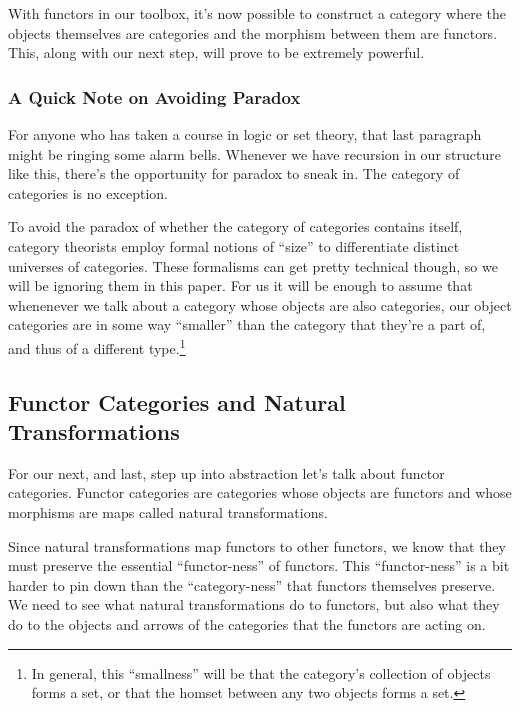 \documentclass[12pt]{article}
\begin{document}
With functors in our toolbox, it's now possible to construct a category where the objects themselves are categories and the morphism between them are functors.
This, along with our next step, will prove to be extremely powerful.

\subsubsection*{A Quick Note on Avoiding Paradox}
For anyone who has taken a course in logic or set theory, that last paragraph might be ringing some alarm bells.
Whenever we have recursion in our structure like this, there's the opportunity for paradox to sneak in.
The category of categories is no exception.

To avoid the paradox of whether the category of categories contains itself, category theorists employ formal notions of ``size'' to differentiate distinct universes of categories.
These formalisms can get pretty technical though, so we will be ignoring them in this paper.
For us it will be enough to assume that whenenever we talk about a category whose objects are also categories, our object categories are in some way ``smaller'' than the category that they're a part of, and thus of a different type.\footnote{In general, this ``smallness'' will be that the category's collection of objects forms a set, or that the homset between any two objects forms a set.}

\subsection*{Functor Categories and Natural Transformations}
For our next, and last, step up into abstraction let's talk about functor categories.
Functor categories are categories whose objects are functors and whose morphisms are maps called natural transformations.

Since natural transformations map functors to other functors, we know that they must preserve the essential ``functor-ness'' of functors.
This ``functor-ness'' is a bit harder to pin down than the ``category-ness'' that functors themselves preserve.
We need to see what natural transformations do to functors, but also what they do to the objects and arrows of the categories that the functors are acting on.
\end{document}
